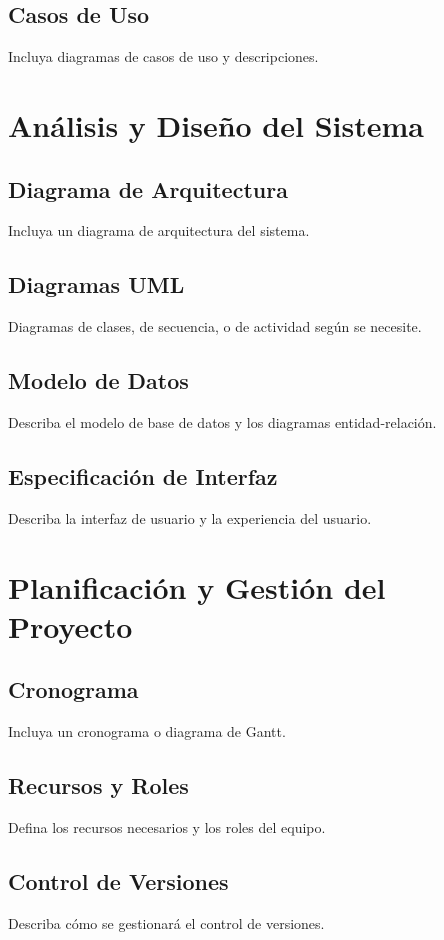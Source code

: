 \documentclass[a4paper, 12pt]{report}
\begin{document}
	\section{Casos de Uso}
	Incluya diagramas de casos de uso y descripciones.
	
	\chapter{Análisis y Diseño del Sistema}
	\section{Diagrama de Arquitectura}
	Incluya un diagrama de arquitectura del sistema.
	
	\section{Diagramas UML}
	Diagramas de clases, de secuencia, o de actividad según se necesite.
	
	\section{Modelo de Datos}
	Describa el modelo de base de datos y los diagramas entidad-relación.
	
	\section{Especificación de Interfaz}
	Describa la interfaz de usuario y la experiencia del usuario.
	
	\chapter{Planificación y Gestión del Proyecto}
	\section{Cronograma}
	Incluya un cronograma o diagrama de Gantt.
	
	\section{Recursos y Roles}
	Defina los recursos necesarios y los roles del equipo.
	
	\section{Control de Versiones}
	Describa cómo se gestionará el control de versiones.
	
\end{document}

